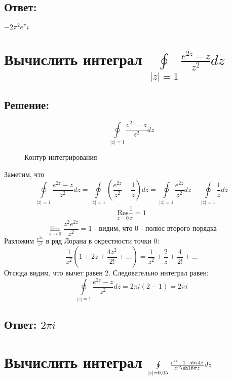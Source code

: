 \documentclass{article}
\begin{document}
	\subsection{Ответ:}
	$ -2\pi^2 e^\pi i$
	
	\section{Вычислить интеграл $\oint\limits_{|z|=1}\frac{e^{2z}-z}{z^2} dz$}
	
	\subsection{Решение:}
	\[\oint\limits_{|z|=1}\frac{e^{2z}-z}{z^2} dz\]
	\begin{figure}[h]
		\centering
		\caption{Контур интегрирования}
		
	\end{figure}
	\newline
	Заметим, что \[\oint\limits_{|z|=1}\frac{e^{2z}-z}{z^2} dz = \oint\limits_{|z|=1}\left(\frac{e^{2z}}{z^2} - \frac{1}{z}\right) dz = \oint\limits_{|z|=1}\frac{e^{2z}}{z^2}dz - \oint\limits_{|z|=1}\frac{1}{z}dz\]
	\[\underset{z=0}{\text{Res}} \frac{1}{z} = 1\]
	\[\lim\limits_{z\rightarrow0} \frac{z^2 e^{2z}}{z^2} = 1 \text{ - видим, что 0 - полюс второго порядка}\]
	Разложим $\frac{e^{2z}}{z^2}$ в ряд Лорана в окрестности точки 0:
	\[\frac{1}{z^2}\left(1 + 2z + \frac{4z^2}{2!} + \dots\right) = \frac{1}{z^2} + \frac{2}{z} + \frac{4}{2!} + \dots\]
	Отсюда видим, что вычет равен 2. Следовательно интеграл равен:
	\[\oint\limits_{|z|=1}\frac{e^{2z}-z}{z^2} dz = 2\pi i (2 - 1) = 2\pi i\]
	\subsection{Ответ: $2\pi i$}
	
	\section{Вычислить интеграл $\oint\limits_{|z|=0,05} \frac{e^{iz} - 1 -\sin 4z}{z^3 \sh 16 \pi z}dz$}
\end{document}
